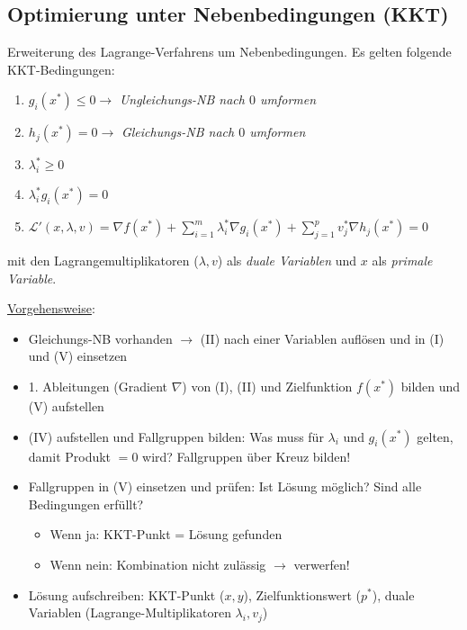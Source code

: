 \subsection{Optimierung unter Nebenbedingungen (KKT)}

Erweiterung des Lagrange-Verfahrens um Nebenbedingungen.
Es gelten folgende KKT-Bedingungen:

\begin{enumerate}[label=(\Roman*)]
    \item \(g_i(x^*)\leq 0 \rightarrow \) \emph{Ungleichungs-NB nach \(0\) umformen}
    \item \(h_j(x^*)=0 \rightarrow\) \emph{Gleichungs-NB nach \(0\) umformen}
    \item \(\lambda_i^*\geq 0\)
    \item \(\lambda_i^*g_i(x^*)=0\)
    \item $\mathcal{L}'(x,\lambda, v) = \nabla f(x^*) + \sum_{i=1}^m \lambda_i^* \nabla g_i(x^*) + \sum_{j=1}^p v_j^* \nabla h_j(x^*) = 0$\\
\end{enumerate}

mit den Lagrangemultiplikatoren ($\lambda, v$) als \emph{duale Variablen} und $x$ als \emph{primale Variable}.\\\newpage

\underline{Vorgehensweise}:
\begin{itemize}
    \item Gleichungs-NB vorhanden \(\rightarrow\) (II) nach einer Variablen auflösen und in (I) und (V) einsetzen
    \item 1. Ableitungen (Gradient \(\nabla\)) von (I), (II) und Zielfunktion \(f(x^*)\) bilden und (V) aufstellen
    \item (IV) aufstellen und Fallgruppen bilden: Was muss für \(\lambda_i\) und \(g_i(x^*)\) gelten, damit Produkt \(=0\) wird? Fallgruppen über Kreuz bilden!
    \item Fallgruppen in (V) einsetzen und prüfen: Ist Lösung möglich? Sind alle Bedingungen erfüllt?
    \begin{itemize}
        \item Wenn ja: KKT-Punkt = Lösung gefunden
        \item Wenn nein: Kombination nicht zulässig \(\rightarrow\) verwerfen!\\
    \end{itemize}
    \item Lösung aufschreiben: KKT-Punkt (\(x, y\)), Zielfunktionswert (\(p^*\)), duale Variablen (Lagrange-Multiplikatoren \(\lambda_i, v_j\))\\
\end{itemize}

